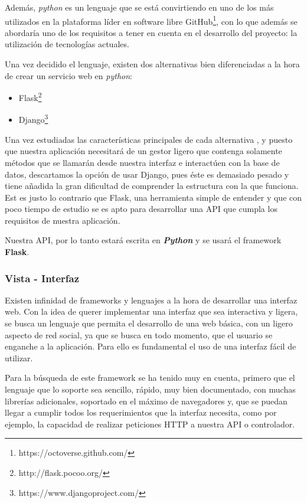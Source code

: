 Además, \textit{python} es un lenguaje que se está convirtiendo en uno de los más utilizados en la plataforma líder en software libre GitHub\footnote{https://octoverse.github.com/}, con lo que además se abordaría uno de los requisitos a tener en cuenta en el desarrollo del proyecto: la utilización de tecnologías actuales.

Una vez decidido el lenguaje, existen dos alternativas bien diferenciadas a la hora de crear un servicio web en \textit{python}:

\begin{itemize}
    \item Flask\footnote{http://flask.pocoo.org/}
    \item Django\footnote{https://www.djangoproject.com/}
\end{itemize}

Una vez estudiadas las características principales de cada alternativa\cite{flaskvsdjango1} , y puesto que nuestra aplicación necesitará de un gestor ligero que contenga solamente métodos que se llamarán desde nuestra interfaz e interactúen con la base de datos, descartamos la opción de usar Django, pues éste es demasiado pesado y tiene añadida la gran dificultad de comprender la estructura con la que funciona. Est es justo lo contrario que Flask, una herramienta simple de entender y que con poco tiempo de estudio se es apto para desarrollar una API que cumpla los requisitos de nuestra aplicación. 

Nuestra API, por lo tanto estará escrita en \textit{\textbf{Python}} y se usará el framework \textbf{Flask}.

\subsubsection{Vista - Interfaz}
\label{sec::analisis_vistaInterfaz}
Existen infinidad de frameworks y lenguajes a la hora de desarrollar una interfaz web. Con la idea de querer implementar una interfaz que sea interactiva y ligera, se busca un lenguaje que permita el desarrollo de una web básica, con un ligero aspecto de red social, ya que se busca en todo momento, que el usuario se enganche a la aplicación. Para ello es fundamental el uso de una interfaz fácil de utilizar.

Para la búsqueda de este framework se ha tenido muy en cuenta, primero que el lenguaje que lo soporte sea sencillo, rápido, muy bien documentado, con muchas librerías adicionales, soportado en el máximo de navegadores y, que se puedan llegar a cumplir todos los requerimientos que la interfaz necesita, como por ejemplo, la capacidad de realizar peticiones HTTP a nuestra API o controlador.

